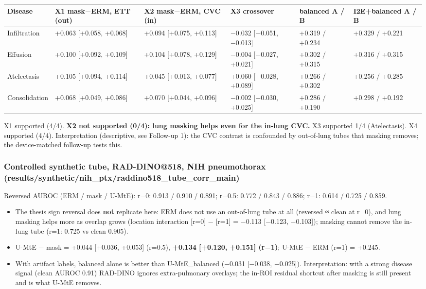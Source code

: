 {{ %
\begin{longtable}[]{@{}llllll@{}}
\toprule\noalign{}
Disease & X1 mask−ERM, ETT (out) & X2 mask−ERM, CVC (in) & X3 crossover & balanced A / B & I2E+balanced A / B \\
\midrule\noalign{}
\endhead
\bottomrule\noalign{}
\endlastfoot
Infiltration & +0.063 {[}+0.058, +0.068{]} & +0.094 {[}+0.075, +0.113{]} & −0.032 {[}−0.051, −0.013{]} & +0.319 / +0.234 & +0.329 / +0.221 \\
Effusion & +0.100 {[}+0.092, +0.109{]} & +0.104 {[}+0.078, +0.129{]} & −0.004 {[}−0.027, +0.021{]} & +0.302 / +0.315 & +0.316 / +0.315 \\
Atelectasis & +0.105 {[}+0.094, +0.114{]} & +0.045 {[}+0.013, +0.077{]} & +0.060 {[}+0.028, +0.089{]} & +0.266 / +0.302 & +0.256 / +0.285 \\
Consolidation & +0.068 {[}+0.049, +0.086{]} & +0.070 {[}+0.044, +0.096{]} & −0.002 {[}−0.030, +0.025{]} & +0.286 / +0.190 & +0.298 / +0.192 \\
\end{longtable}
}

X1 supported (4/4). \textbf{X2 not supported (0/4): lung masking helps even for the in-lung CVC.} X3 supported 1/4
(Atelectasis). X4 supported (4/4). Interpretation (descriptive, see Follow-up 1): the CVC contrast is confounded by
out-of-lung tubes that masking removes; the device-matched follow-up tests this.

\subsubsection{Controlled synthetic tube, RAD-DINO@518, NIH pneumothorax (results/synthetic/nih\_ptx/raddino518\_tube\_corr\_main)}\label{controlled-synthetic-tube-rad-dino518-nih-pneumothorax-resultssyntheticnih_ptxraddino518_tube_corr_main}

Reversed AUROC (ERM / mask / U-MtE): r=0: 0.913 / 0.910 / 0.891; r=0.5: 0.772 / 0.843 / 0.886; r=1: 0.614 / 0.725 / 0.859.

\begin{itemize}

\item
  The thesis sign reversal does \textbf{not} replicate here: ERM does not use an out-of-lung tube at all (reversed ≈
  clean at r=0), and lung masking helps more as overlap grows (location interaction {[}r=0{]} − {[}r=1{]} = −0.113
  {[}−0.123, −0.103{]}); masking cannot remove the in-lung tube (r=1: 0.725 vs clean 0.905).
\item
  U-MtE − mask = +0.044 {[}+0.036, +0.053{]} (r=0.5), \textbf{+0.134 {[}+0.120, +0.151{]} (r=1)}; U-MtE − ERM (r=1) = +0.245.
\item
  With artifact labels, balanced alone is better than U-MtE\_balanced (−0.031 {[}−0.038, −0.025{]}).
  Interpretation: with a strong disease signal (clean AUROC 0.91) RAD-DINO ignores extra-pulmonary overlays; the
  in-ROI residual shortcut after masking is still present and is what U-MtE removes.
\end{itemize}

}

